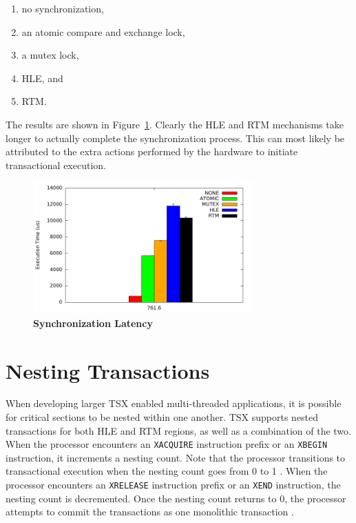 \documentclass[11pt]{book}
\begin{document}
\vspace*{-\bigskipamount}
\begin{singlespace}
\begin{enumerate}
  \item no synchronization,
  \item an atomic compare and exchange lock,
  \item a mutex lock,
  \item HLE, and
  \item RTM.
\end{enumerate}
\end{singlespace}

\noindent
The results are shown in Figure~\ref{fig:tsx_latency}.  Clearly the HLE and RTM mechanisms
take longer to actually complete the synchronization process.  This can most likely be
attributed to the extra actions performed by the hardware to initiate transactional
execution.

\begin{figure}[H]
    \centering
    \graphicspath{ {./figures/} }
    \includegraphics[width=0.75\textwidth,keepaspectratio]{SyncBM}
    \caption{\textbf{Synchronization Latency}}\label{fig:tsx_latency}
\end{figure}

\section{Nesting Transactions}

When developing larger TSX enabled multi-threaded applications, it is possible for
critical sections to be nested within one another.  TSX supports nested transactions for
both HLE and RTM regions, as well as a combination of the two.  When the processor
encounters an \texttt{XACQUIRE} instruction prefix or an \texttt{XBEGIN} instruction, it
increments a nesting count.  Note that the processor transitions to transactional
execution when the nesting count goes from 0 to 1 \cite{intel_prog_ref}.  When the
processor encounters an \texttt{XRELEASE} instruction prefix or an \texttt{XEND}
instruction, the nesting count is decremented.  Once the nesting count returns to 0, the
processor attempts to commit the transactions as one monolithic transaction
\cite{intel_prog_ref}.
\end{document}
